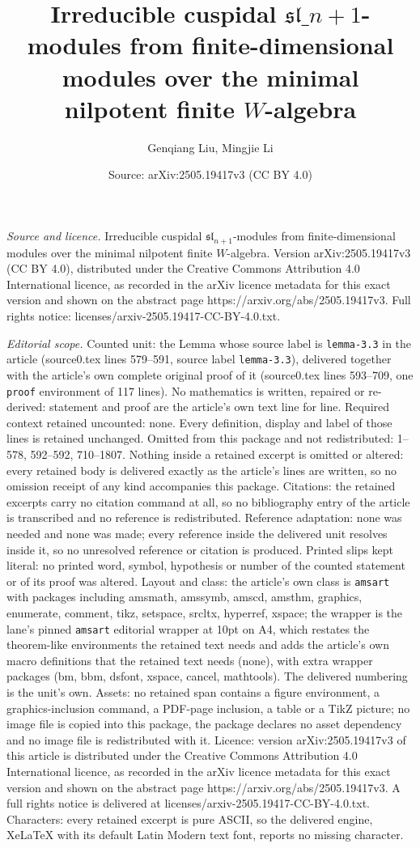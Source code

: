\documentclass[10pt,a4paper]{amsart}
\title[Irreducible cuspidal $\mathfrak{sl}\_{n+1}$-modules from fini]{Irreducible cuspidal $\mathfrak{sl}\_{n+1}$-modules from finite-dimensional modules over the minimal nilpotent finite $W$-algebra}
\author{Genqiang Liu, Mingjie Li}
\date{Source: arXiv:2505.19417v3 (CC BY 4.0)}
\begin{document}
\maketitle

\noindent\emph{Source and licence.} Irreducible cuspidal $\mathfrak{sl}_{n+1}$-modules from finite-dimensional modules over the minimal nilpotent finite $W$-algebra. Version arXiv:2505.19417v3 (CC BY 4.0), distributed under the Creative Commons Attribution 4.0 International licence, as recorded in the arXiv licence metadata for this exact version and shown on the abstract page https://arxiv.org/abs/2505.19417v3. Full rights notice: licenses/arxiv-2505.19417-CC-BY-4.0.txt.\par\smallskip

\noindent\textit{Editorial scope.} Counted unit: the Lemma whose source label is \texttt{lemma-3.3} in the article (source0.tex lines 579--591, source label \texttt{lemma-3.3}), delivered together with the article's own complete original proof of it (source0.tex lines 593--709, one \texttt{proof} environment of 117 lines). No mathematics is written, repaired or re-derived: statement and proof are the article's own text line for line. Required context retained uncounted: none. Every definition, display and label of those lines is retained unchanged. Omitted from this package and not redistributed: 1--578, 592--592, 710--1807. Nothing inside a retained excerpt is omitted or altered: every retained body is delivered exactly as the article's lines are written, so no omission receipt of any kind accompanies this package. Citations: the retained excerpts carry no citation command at all, so no bibliography entry of the article is transcribed and no reference is redistributed. Reference adaptation: none was needed and none was made; every reference inside the delivered unit resolves inside it, so no unresolved reference or citation is produced. Printed slips kept literal: no printed word, symbol, hypothesis or number of the counted statement or of its proof was altered. Layout and class: the article's own class is \texttt{amsart} with packages including amsmath, amssymb, amscd, amsthm, graphics, enumerate, comment, tikz, setspace, srcltx, hyperref, xspace; the wrapper is the lane's pinned \texttt{amsart} editorial wrapper at 10pt on A4, which restates the theorem-like environments the retained text needs and adds the article's own macro definitions that the retained text needs (none), with extra wrapper packages (bm, bbm, dsfont, xspace, cancel, mathtools). The delivered numbering is the unit's own. Assets: no retained span contains a figure environment, a graphics-inclusion command, a PDF-page inclusion, a table or a TikZ picture; no image file is copied into this package, the package declares no asset dependency and no image file is redistributed with it. Licence: version arXiv:2505.19417v3 of this article is distributed under the Creative Commons Attribution 4.0 International licence, as recorded in the arXiv licence metadata for this exact version and shown on the abstract page https://arxiv.org/abs/2505.19417v3. A full rights notice is delivered at licenses/arxiv-2505.19417-CC-BY-4.0.txt. Characters: every retained excerpt is pure ASCII, so the delivered engine, XeLaTeX with its default Latin Modern text font, reports no missing character.
\end{document}
